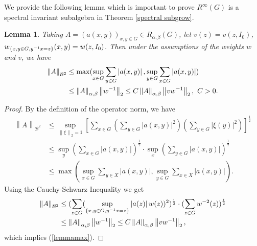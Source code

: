 \documentclass[preprint,11pt]{elsarticle}
\newtheorem{lemma}{Lemma}[section]
\numberwithin{equation}{section}
\begin{document}
	We provide the following lemma which is important to prove $R^{\infty }(G)$ is a spectral invariant subalgebra in Theorem \ref{spectral subgrow}.
	\begin{lemma}
		Taking $A=(a(x,y))_{x,y\in G}\in R_{\alpha,\beta}(G) $, let $ v(z)=v(z,I_{0} )$, $ w_{\left \{ x,y\in G,y^{-1}x=z \right \} }\\(x,y)=w(z,I_{0} )$. Then under the assumptions of the weights $w$ and $v$, we have
		\begin{align}\label{lemmamax}
			\left \| A \right \| _{\mathcal{B}^{2} }&\le \max (\sup_{x\in G}\sum _{y\in G}\left | a(x,y) \right |, \sup_{y\in G}\sum _{x\in G}\left | a(x,y) \right |)\notag\\
			&\leq  \left \| A \right \|_{\alpha,\beta}\left \| w^{-1}  \right \|_{2}\le C\left \| A \right \|_{\alpha,\beta}\left \| vw^{-1}  \right \|_{2},~ C>0.
		\end{align}
	\end{lemma}
	\begin{proof}
		By the definition of the operator norm, we have
		\begin{align*}
			\left \| A \right \| _{\mathcal{B}^{2} }&
			\le \sup_{\left \| \xi  \right \|_{2} =1}[ \sum _{x\in G} ( \sum _{y\in G} \left | a(x,y) \right |^{2}  ) (  \sum _{y\in G} \left | \xi (y) \right | ^{2}) ] ^\frac{1}{2}\\
			&\le \sup_{y} (\sum _{x\in G}\left | a(x,y) \right |) ^\frac{1}{2}\cdot \sup_{x}( \sum _{y\in G}\left | a(x,y) \right |) ^\frac{1}{2}\\
			&\le \max (\sup_{x\in G}\sum _{y\in X}\left | a(x,y) \right |, \sup_{y\in G}\sum _{x\in X}\left | a(x,y) \right |).
		\end{align*}
		Using the Cauchy-Schwarz Inequality we get 
		\begin{align*}
			\left \| A \right \| _{\mathcal{B}^{2} }
			&\le (\sum _{z\in G}  (\sup_{\left \{ x,y\in G,y^{-1}x=z \right \} } \left | a(z) \right | w(z))^2 )^\frac{1}{2} \cdot(\sum_{z\in G}  w^{-2}(z))^\frac{1}{2}\notag\\
			&%
			\le \left \| A \right \|_{\alpha,\beta}\left \| w^{-1} \right \| _2\le C\left \| A \right \|_{\alpha,\beta}\left \| vw^{-1} \right \|_2,
		\end{align*}
		which implies  (\ref{lemmamax}).
	\end{proof}
	
\end{document}
